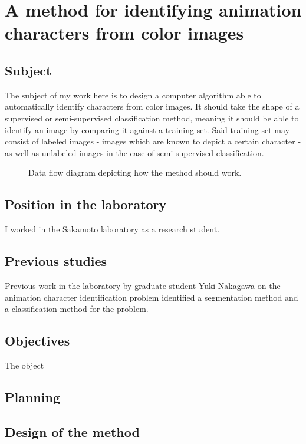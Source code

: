 \section{A method for identifying animation characters from color images}
\subsection{Subject}
The subject of my work here is to design a computer algorithm able to automatically identify characters from color images. It should take the shape of a supervised or semi-supervised classification method, meaning it should be able to identify an image by comparing it against a training set. Said training set may consist of labeled images - images which are known to depict a certain character - as well as unlabeled images in the case of semi-supervised classification.

\begin{figure}[htb!]
\caption{Data flow diagram depicting how the method should work.}
\label{fig:methodDiagram}
\end{figure}

\subsection{Position in the laboratory}
I worked in the Sakamoto laboratory as a research student.
\subsection{Previous studies}
Previous work in the laboratory by graduate student Yuki Nakagawa on the animation character identification problem identified a segmentation method\cite{felzenszwal04} and a classification\cite{harchaoui07} method for the problem.
\subsection{Objectives}
The object
\subsection{Planning}
\subsection{Design of the method}
